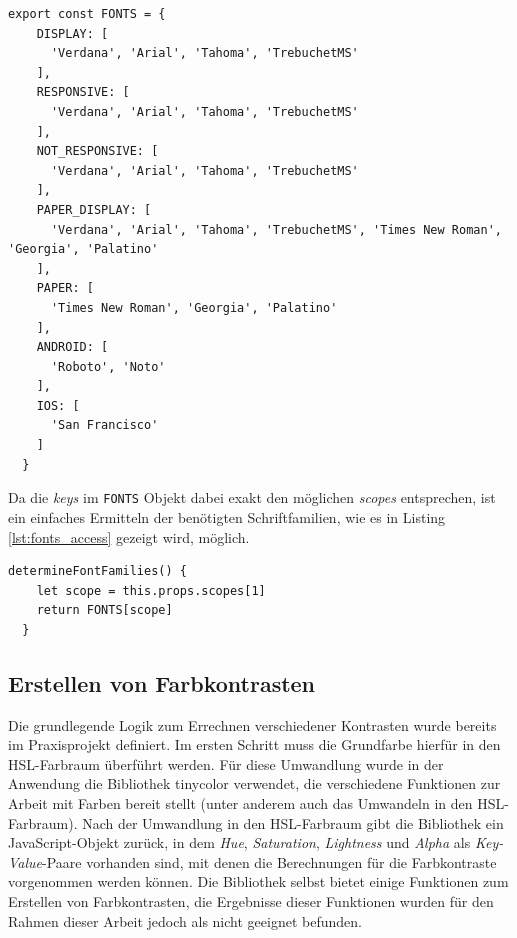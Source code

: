 \begin{lstlisting}[caption=Aufbau des \texttt{FONTS} Objektes, label=lst:fonts_object]
  export const FONTS = {
    DISPLAY: [
      'Verdana', 'Arial', 'Tahoma', 'TrebuchetMS'
    ],
    RESPONSIVE: [
      'Verdana', 'Arial', 'Tahoma', 'TrebuchetMS'
    ],
    NOT_RESPONSIVE: [
      'Verdana', 'Arial', 'Tahoma', 'TrebuchetMS'
    ],
    PAPER_DISPLAY: [
      'Verdana', 'Arial', 'Tahoma', 'TrebuchetMS', 'Times New Roman', 'Georgia', 'Palatino'
    ],
    PAPER: [
      'Times New Roman', 'Georgia', 'Palatino'
    ],
    ANDROID: [
      'Roboto', 'Noto'
    ],
    IOS: [
      'San Francisco'
    ]
  }
\end{lstlisting}

Da die \textit{keys} im \texttt{FONTS} Objekt dabei exakt den möglichen \textit{scopes} entsprechen\footnotemark{}, ist ein einfaches Ermitteln der benötigten Schriftfamilien, wie es in Listing \ref{lst:fonts_access} gezeigt wird, möglich.


\begin{lstlisting}[caption=Zugriff auf Werte des \texttt{FONTS} Objektes, label=lst:fonts_access]
  determineFontFamilies() {
    let scope = this.props.scopes[1]
    return FONTS[scope]
  }
\end{lstlisting}

\subsection{Erstellen von Farbkontrasten}
\label{chap:colors_dev}
Die grundlegende Logik zum Errechnen verschiedener Kontrasten wurde bereits im Praxisprojekt definiert. Im ersten Schritt muss die Grundfarbe hierfür in den HSL-Farbraum überführt werden. Für diese Umwandlung wurde in der Anwendung die Bibliothek tinycolor\footnotemark{} verwendet, die verschiedene Funktionen zur Arbeit mit Farben bereit stellt (unter anderem auch das Umwandeln in den HSL-Farbraum).
Nach der Umwandlung in den HSL-Farbraum gibt die Bibliothek ein JavaScript-Objekt zurück, in dem \textit{Hue}, \textit{Saturation}, \textit{Lightness} und \textit{Alpha} als \textit{Key-Value}-Paare vorhanden sind, mit denen die Berechnungen für die Farbkontraste vorgenommen werden können. Die Bibliothek selbst bietet einige Funktionen zum Erstellen von Farbkontrasten, die Ergebnisse dieser Funktionen wurden für den Rahmen dieser Arbeit jedoch als nicht geeignet befunden.

